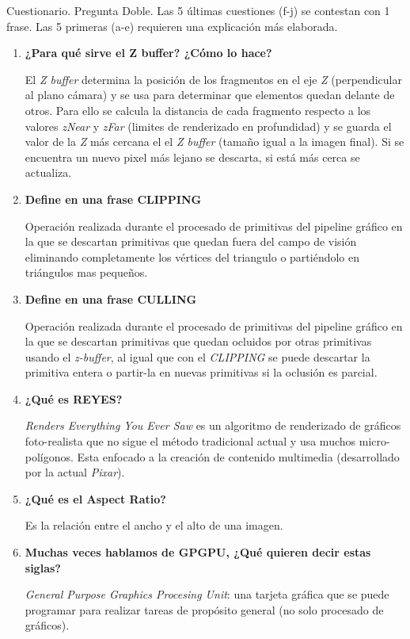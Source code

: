 \begin{pregunta}{Cuestionario. Pregunta Doble. Las 5 últimas cuestiones (f-j) se contestan con 1 frase. Las 5
primeras (a-e) requieren una explicación más elaborada.}
\begin{enumerate}[label=\textbf{(\alph*)}]
\item \textbf{¿Para qué sirve el Z buffer? ¿Cómo lo hace?}

        El \emph{Z buffer} determina la posición de los fragmentos en el eje
        \emph{Z} (perpendicular al plano cámara) y se usa para determinar que
        elementos quedan delante de otros. Para ello se calcula la distancia de
        cada fragmento respecto a los valores \emph{zNear} y \emph{zFar}
        (limites de renderizado en profundidad) y se guarda el valor de la
        \emph{Z} más cercana el el \emph{Z buffer} (tamaño igual a la imagen
        final). Si se encuentra un nuevo pixel más lejano se descarta, si está
        más cerca se actualiza.

        \pagebreak
\item \textbf{Define en una frase CLIPPING}

        Operación realizada durante el procesado de primitivas del pipeline
        gráfico en la que se descartan primitivas que quedan fuera del campo de
        visión eliminando completamente los vértices del triangulo o partiéndolo
        en triángulos mas pequeños.

\item \textbf{Define en una frase CULLING}

        Operación realizada durante el procesado de primitivas del pipeline
        gráfico en la que se descartan primitivas que quedan ocluidos por otras
        primitivas usando el \emph{z-buffer}, al igual que con el \emph{CLIPPING}
        se puede descartar la primitiva entera o partir-la en nuevas primitivas
        si la oclusión es parcial.

\item \textbf{¿Qué es REYES?}

        \emph{Renders Everything You Ever Saw} es un algoritmo de renderizado de
        gráficos foto-realista que no sigue el método tradicional actual y usa
        muchos micro-polígonos. Esta enfocado a la creación de contenido
        multimedia (desarrollado por la actual \emph{Pixar}).
        \cite{shua_rispec_2011}

\item \textbf{¿Qué es el Aspect Ratio?}

        Es la relación entre el ancho y el alto de una imagen.

\item \textbf{Muchas veces hablamos de GPGPU, ¿Qué quieren decir estas siglas?}

        \emph{General Purpose Graphics Procesing Unit}: una tarjeta gráfica que
        se puede programar para realizar tareas de propósito general (no solo
        procesado de gráficos).

\end{enumerate}

\end{pregunta}
